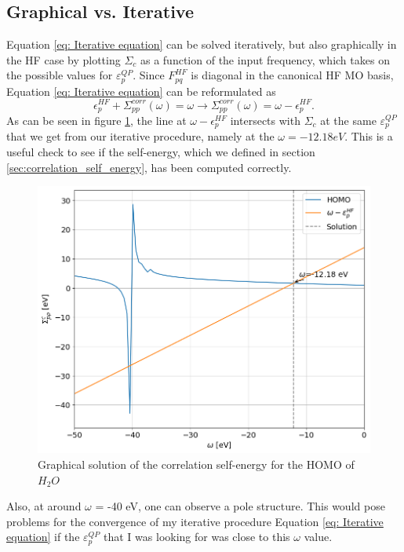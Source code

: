 \documentclass[12pt]{caltech_thesis}
\begin{document}
\subsection{Graphical vs. Iterative}
Equation \ref{eq: Iterative equation} can be solved iteratively, but also graphically in the HF case by plotting $\Sigma _{c}$ as a function of the input frequency, which takes on  the possible values for $\varepsilon_{p}^{QP}$. Since $F_{pq}^{HF}$ is diagonal in the canonical HF MO basis, Equation \ref{eq: Iterative equation} can be reformulated as
\begin{equation}
    \epsilon _{p}^{HF} + \Sigma_{pp}^{corr}(\omega) = \omega  \rightarrow \Sigma_{pp}^{corr}(\omega) = \omega  - \epsilon _{p}^{HF}.
\end{equation}
As can be seen in figure \ref{fig:graphic}, the line at $\omega - \epsilon_{p}^{HF}$ intersects with $\Sigma _{c}$ at the same $\varepsilon_{p}^{QP}$ that we get from our iterative procedure, namely at the $\omega = -12.18 eV$.
 This is a useful check to see if the self-energy, which we defined in section \ref{sec:correlation_self_energy}, has been computed correctly.

\begin{figure}[h]
    \centering
    \includegraphics[width=\textwidth]{correlation_energies.png}
\caption{Graphical solution of the correlation self-energy for the HOMO of $H_2O$}
\label{fig:graphic}
\end{figure}
Also, at around $\omega$ = -40 eV, one can observe a pole structure. This would pose problems for the convergence of my iterative procedure Equation \ref{eq: Iterative equation} if the $\varepsilon_{p}^{QP}$ that I was looking for was close to this $\omega $ value. 
\end{document}
